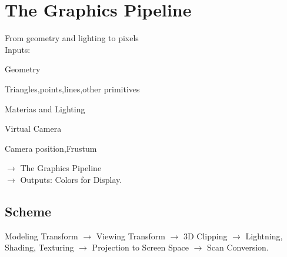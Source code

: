 \lstset{ %
	language=c++
}
\setcounter{chapter}{0}
\chapter{The Graphics Pipeline}
From geometry and lighting to pixels\\
Inputs:\\
\begin{enumerate*}[label=\protect\circled{\arabic*},itemjoin=]
	\item Geometry\\
		\begin{itemize*}[label=\colorbullet,itemjoin=]
			\item Triangles,points,lines,other primitives\\
		\end{itemize*}
	\item Materias and Lighting\\
	\item Virtual Camera\\
		\begin{itemize*}[label=\colorbullet,itemjoin=]
			\item Camera position,Frustum\\
		\end{itemize*}
\end{enumerate*}
$\to$ The Graphics Pipeline \\$\to$ Outputs: Colors for Display.
\section{Scheme}
Modeling Transform $\to$ Viewing Transform $\to$ 3D Clipping $\to$ Lightning, Shading, Texturing $\to$ Projection to Screen Space $\to$ Scan Conversion.
